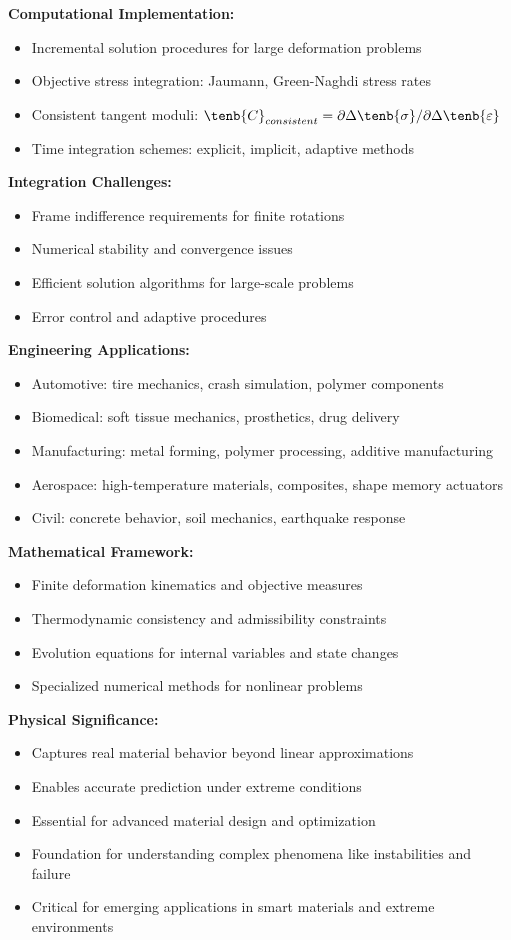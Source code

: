 \begin{subox}[Summary]
\textbf{Computational Implementation:}
\begin{itemize}
\item Incremental solution procedures for large deformation problems
\item Objective stress integration: Jaumann, Green-Naghdi stress rates
\item Consistent tangent moduli: $\tenb{C}_{consistent} = \partial \Delta\tenb{\sigma}/\partial \Delta\tenb{\varepsilon}$
\item Time integration schemes: explicit, implicit, adaptive methods
\end{itemize}

\textbf{Integration Challenges:}
\begin{itemize}
\item Frame indifference requirements for finite rotations
\item Numerical stability and convergence issues
\item Efficient solution algorithms for large-scale problems
\item Error control and adaptive procedures
\end{itemize}

\textbf{Engineering Applications:}
\begin{itemize}
\item Automotive: tire mechanics, crash simulation, polymer components
\item Biomedical: soft tissue mechanics, prosthetics, drug delivery
\item Manufacturing: metal forming, polymer processing, additive manufacturing
\item Aerospace: high-temperature materials, composites, shape memory actuators
\item Civil: concrete behavior, soil mechanics, earthquake response
\end{itemize}

\textbf{Mathematical Framework:}
\begin{itemize}
\item Finite deformation kinematics and objective measures
\item Thermodynamic consistency and admissibility constraints
\item Evolution equations for internal variables and state changes
\item Specialized numerical methods for nonlinear problems
\end{itemize}

\textbf{Physical Significance:}
\begin{itemize}
\item Captures real material behavior beyond linear approximations
\item Enables accurate prediction under extreme conditions
\item Essential for advanced material design and optimization
\item Foundation for understanding complex phenomena like instabilities and failure
\item Critical for emerging applications in smart materials and extreme environments
\end{itemize}


\end{subox}
